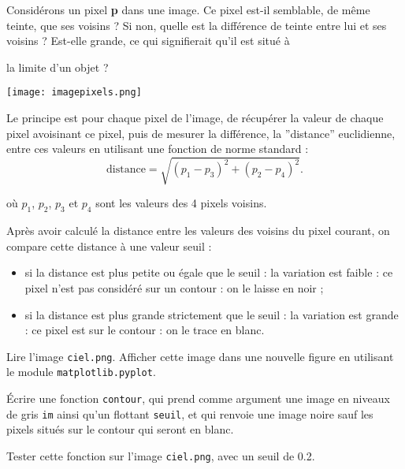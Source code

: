 Considérons un pixel \textbf{p} dans une image. Ce pixel est-il semblable, de même teinte, que ses voisins ? Si non, quelle est la différence de teinte entre lui et ses voisins ? Est-elle grande, ce qui signifierait qu’il est situé à 

la limite d’un objet ?
\begin{marginfigure}
\centering
\texttt{[image: imagepixels.png]}
\end{marginfigure}


Le principe est pour chaque pixel de l'image, de récupérer la valeur de chaque pixel avoisinant ce pixel, puis de mesurer la différence, la ”distance” euclidienne, entre ces valeurs en utilisant une fonction de norme standard :
$$
\text{distance}=\sqrt{(p_1-p_3)^2+(p_2-p_4)^2}.
$$



 où $ p_1$, $p_2$, $ p_3$ et $ p_4$ sont les valeurs des 4 pixels voisins.


Après avoir calculé la distance entre les valeurs des voisins du pixel courant, on compare cette distance à une valeur seuil :
\begin{itemize}
\item si la distance est plus petite ou égale que le seuil : la variation est faible : ce pixel n'est pas considéré sur un contour : on le laisse en noir ;
\item si la distance est plus grande strictement que le seuil : la variation est grande : ce pixel est sur le contour : on le trace en blanc.
\end{itemize}


\begin{question}
Lire l'image \lstinline{ciel.png}. Afficher cette image dans une nouvelle figure en utilisant le module \lstinline{matplotlib.pyplot}.
\end{question}



\begin{question}
\'Ecrire une fonction \lstinline{contour}, qui prend comme argument une image en niveaux de gris \lstinline{im} ainsi qu'un flottant \lstinline{seuil}, et qui renvoie une image noire sauf les pixels situés sur le contour qui seront en blanc.
\end{question}

\begin{question}
Tester cette fonction sur l'image  \lstinline{ciel.png}, avec un seuil de 0.2.
\end{question}

